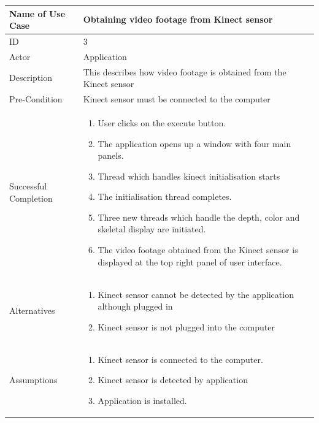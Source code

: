 \documentclass[a4paper, 12pt]{article}
\newcommand\addrow[2]{#1 &#2\\ }
\newcommand\addheading[2]{#1 &#2\\ \hline}
\newcommand\tabularhead{\begin{tabular}{lp{8cm}}
\hline
}
\newcommand\addmulrow[2]{ \begin{minipage}[t][][t]{2.5cm}#1\end{minipage}%
   &\begin{minipage}[t][][t]{8cm}
    \begin{enumerate} #2   \end{enumerate}
    \end{minipage}\\ }
\newenvironment{usecase}{\tabularhead}
{\hline\end{tabular}}
\begin{document}
\begin{usecase}
	\addheading{Name of Use Case}{Obtaining video footage from Kinect sensor}
	\addrow{ID}{3}
	\addrow{Actor}{Application}
	\addrow{Description}{This describes how video footage is obtained from the Kinect sensor}
	\addrow{Pre-Condition}{Kinect sensor must be connected to the computer}
	\addmulrow{Successful Completion}{
		\item User clicks on the execute button. 
		\item The application opens up a window with four main panels. 
		\item Thread which handles kinect initialisation starts
		\item The initialisation thread completes. 
		\item Three new threads which handle the depth, color and skeletal display are initiated.
		\item The video footage obtained from the Kinect sensor is displayed at the top right panel of user interface.}
	\addmulrow{Alternatives}{
	\item Kinect sensor cannot be detected by the application although plugged in
	\item Kinect sensor is not plugged into the computer}
	\addmulrow{Assumptions}{
	\item Kinect sensor is connected to the computer.
	\item Kinect sensor is detected by application 
	\item Application is installed.}
\end{usecase}
\end{document}

